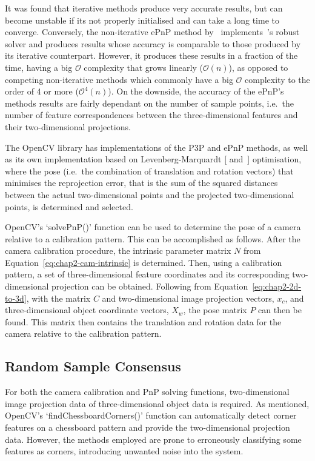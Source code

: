 It was found that iterative methods produce very accurate results, but can become unstable if its not properly initialised and can take a long time to converge. Conversely, the non-iterative ePnP method by~\citeauthor{lepetit2009epnp} implements~\citeauthor{schweighofer2006robust}'s robust solver and produces results whose accuracy is comparable to those produced by its iterative counterpart. However, it produces these results in a fraction of the time, having a big $\mathcal{O}$ complexity that grows linearly ($\mathcal{O}(n)$), as opposed to competing non-iterative methods which commonly have a big $\mathcal{O}$ complexity to the order of 4 or more ($\mathcal{O}^4(n)$). On the downside, the accuracy of the ePnP's methods results are fairly dependant on the number of sample points, i.e.\ the number of feature correspondences between the three-dimensional features and their two-dimensional projections. 

The OpenCV library has implementations of the P3P and ePnP methods, as well as its own implementation based on Levenberg-Marquardt [\cite{levenberg1944method} and~\cite{marquardt1963algorithm}] optimisation, where the pose (i.e.\ the combination of translation and rotation vectors) that minimises the reprojection error, that is the sum of the squared distances between the actual two-dimensional points and the projected two-dimensional points, is determined and selected. 

OpenCV's `solvePnP()' function can be used to determine the pose of a camera relative to a calibration pattern. This can be accomplished as follows. After the camera calibration procedure, the intrinsic parameter matrix $N$ from Equation~\ref{eq:chap2-cam-intrinsic} is determined. Then, using a calibration pattern, a set of three-dimensional feature coordinates and its corresponding two-dimensional projection can be obtained. Following from Equation~\ref{eq:chap2-2d-to-3d}, with the matrix $C$ and two-dimensional image projection vectors, $x_c$, and three-dimensional object coordinate vectors, $X_w$, the pose matrix $P$ can then be found. This matrix then contains the translation and rotation data for the camera relative to the calibration pattern. 

\subsection{Random Sample Consensus}

For both the camera calibration and PnP solving functions, two-dimensional image projection data of three-dimensional object data is required. As mentioned, OpenCV's `findChessboardCorners()' function can automatically detect corner features on a chessboard pattern and provide the two-dimensional projection data. However, the methods employed are prone to erroneously classifying some features as corners, introducing unwanted noise into the system. 

